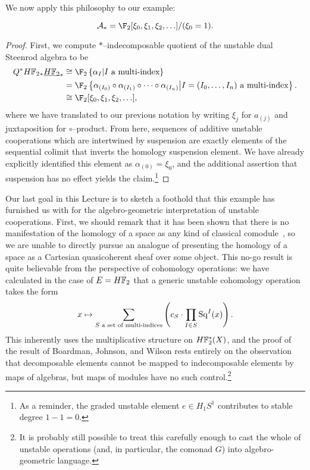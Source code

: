 We now apply this philosophy to our example:
\begin{corollary}\label{StarIndecompsInUDualSteenrodAlg}
\[\mathcal A_* = \F_2[\xi_0, \xi_1, \xi_2, \ldots]/(\xi_0 = 1).\]
\end{corollary}
\begin{proof}
First, we compute \(\ast\)--indecomposable quotient of the unstable dual Steenrod algebra to be
\begin{align*}
Q^\ast \HFtwo_* \OS{\HFtwo}{*} & \cong \F_2\left\{\alpha_{I} \middle| \text{\(I\) a multi-index}\right\} \\
& = \F_2\left\{ \alpha_{(I_0)} \circ \alpha_{(I_1)} \circ \cdots \circ \alpha_{(I_n)} \middle| \text{\(I = (I_0, \ldots, I_n)\) a multi-index}\right\}. \\
& \cong \F_2[\xi_0, \xi_1, \xi_2, \ldots],
\end{align*}
where we have translated to our previous notation by writing \(\xi_j\) for \(a_{(j)}\) and juxtaposition for \(\circ\)--product.  From here, sequences of additive unstable cooperations which are intertwined by suspension are exactly elements of the sequential colimit that inverts the homology suspension element.  We have already explicitly identified this element as \(\alpha_{(0)} = \xi_0\), and the additional assertion that suspension has no effect yields the claim.\footnote{As a reminder, the graded unstable element \(e \in H_1 S^1\) contributes to stable degree \(1 - 1 = 0\).}
\end{proof}

Our last goal in this Lecture is to sketch a foothold that this example has furnished us with for the algebro-geometric interpretation of unstable cooperations.  First, we should remark that it has been shown that there is no manifestation of the homology of a space as any kind of classical comodule~\cite[Theorem 9.4]{BJW}, so we are unable to directly pursue an analogue of  presenting the homology of a space as a Cartesian quasicoherent sheaf over some object.  This no-go result is quite believable from the perspective of cohomology operations: we have calculated in the case of \(E = \HFtwo\) that a generic unstable cohomology operation takes the form \[x \mapsto \sum_{\text{\(S\) a set of multi-indices}} \left(c_S \cdot \prod_{I \in S} \operatorname{Sq}^I(x)\right).\]  This inherently uses the multiplicative structure on \(\HFtwo^*(X)\), and the proof of the result of Boardman, Johnson, and Wilson rests entirely on the observation that decomposable elements cannot be mapped to indecomposable elements by maps of algebras, but maps of modules have no such control.\footnote{It is probably still possible to treat this carefully enough to cast the whole of unstable operations (and, in particular, the comonad \(G\)) into algebro-geometric language.}

